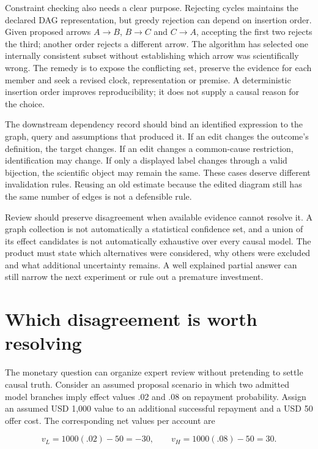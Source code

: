 Constraint checking also needs a clear purpose. Rejecting cycles
maintains the declared DAG representation, but greedy rejection can
depend on insertion order. Given proposed arrows \(A\to B\), \(B\to C\)
and \(C\to A\), accepting the first two rejects the third; another order
rejects a different arrow. The algorithm has selected one internally
consistent subset without establishing which arrow was scientifically
wrong. The remedy is to expose the conflicting set, preserve the
evidence for each member and seek a revised clock, representation or
premise. A deterministic insertion order improves reproducibility; it
does not supply a causal reason for the choice.

The downstream dependency record should bind an identified expression to
the graph, query and assumptions that produced it. If an edit changes
the outcome's definition, the target changes. If an edit changes a
common-cause restriction, identification may change. If only a displayed
label changes through a valid bijection, the scientific object may
remain the same. These cases deserve different invalidation rules.
Reusing an old estimate because the edited diagram still has the same
number of edges is not a defensible rule.

Review should preserve disagreement when available evidence cannot
resolve it. A graph collection is not automatically a statistical
confidence set, and a union of its effect candidates is not
automatically exhaustive over every causal model. The product must state
which alternatives were considered, why others were excluded and what
additional uncertainty remains. A well explained partial answer can
still narrow the next experiment or rule out a premature investment.

\hypertarget{which-disagreement-is-worth-resolving}{%
\section{Which disagreement is worth
resolving}\label{which-disagreement-is-worth-resolving}}

The monetary question can organize expert review without pretending to
settle causal truth. Consider an assumed proposal scenario in which two
admitted model branches imply effect values .02 and .08 on repayment
probability. Assign an assumed USD 1,000 value to an additional
successful repayment and a USD 50 offer cost. The corresponding net
values per account are

\[
 v_L=1000(.02)-50=-30,\qquad
 v_H=1000(.08)-50=30.
\]

